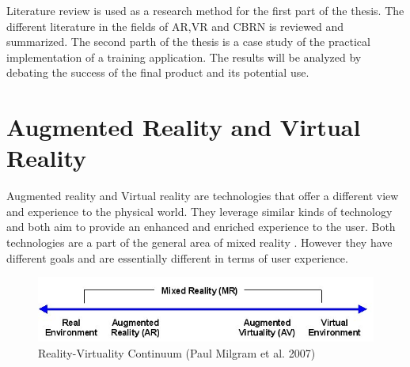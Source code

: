 \documentclass[12pt, a4paper,oneside, nocenter]{thesis}
\begin{document}
Literature review is used as a research method for the first part of the thesis. The different literature in the fields of AR,VR and CBRN is reviewed and summarized. The second parth of the thesis is a case study of the practical implementation of a training application. The results will be analyzed by debating the success of the final product and its potential use.
\par
\chapter{\texorpdfstring{Augmented Reality and Virtual Reality}{aug-reality}}
Augmented reality and Virtual reality are technologies that offer a different view and experience to the physical world. They leverage similar kinds of technology and both aim to provide an enhanced and enriched experience to the user. Both technologies are a part of the general area of mixed reality . However they have different goals and are essentially different in terms of user experience.

\begin{figure}[H]
\includegraphics[width=\textwidth]{Virtuality_Continuum_2}
\caption{Reality-Virtuality Continuum (Paul Milgram et al. 2007)}
\label{fig:reality-virtuality}
\end{figure}
\end{document}
